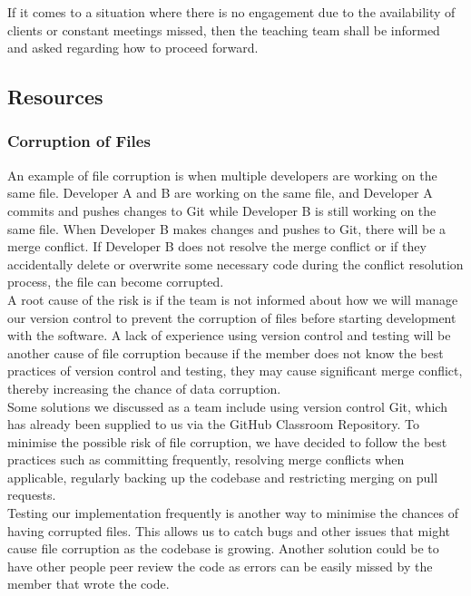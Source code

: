 If it comes to a situation where there is no engagement due to the availability of clients or constant meetings missed, then the teaching team shall be informed and asked regarding how to proceed forward.

\subsection{Resources}

\subsubsection{Corruption of Files}
An example of file corruption is when multiple developers are working on the same file. Developer A and B are working on the same file, and Developer A commits and pushes changes to Git while Developer B is still working on the same file. When Developer B makes changes and pushes to Git, there will be a merge conflict. If Developer B does not resolve the merge conflict or if they accidentally delete or overwrite some necessary code during the conflict resolution process, the file can become corrupted.
\\

A root cause of the risk is if the team is not informed about how we will manage our version control to prevent the corruption of files before starting development with the software. A lack of experience using version control and testing will be another cause of file corruption because if the member does not know the best practices of version control and testing, they may cause significant merge conflict, thereby increasing the chance of data corruption.
\\

Some solutions we discussed as a team include using version control Git, which has already been supplied to us via the GitHub Classroom Repository. To minimise the possible risk of file corruption, we have decided to follow the best practices such as committing frequently, resolving merge conflicts when applicable, regularly backing up the codebase and restricting merging on pull requests.
\\

Testing our implementation frequently is another way to minimise the chances of having corrupted files. This allows us to catch bugs and other issues that might cause file corruption as the codebase is growing. Another solution could be to have other people peer review the code as errors can be easily missed by the member that wrote the code.
\\

